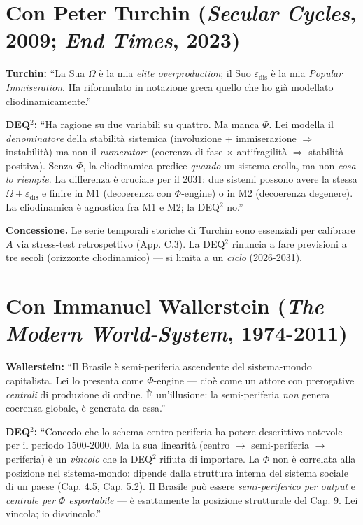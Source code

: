 \section{\texorpdfstring{Con Peter Turchin (\emph{Secular Cycles}, 2009;
\emph{End Times},
2023)}{Con Peter Turchin (Secular Cycles, 2009; End Times, 2023)}}\label{con-peter-turchin-secular-cycles-2009-end-times-2023}

\textbf{Turchin:} ``La Sua \(\Omega\) è la mia \emph{elite
overproduction}; il Suo \(\varepsilon_{\text{dis}}\) è la mia
\emph{Popular Immiseration}. Ha riformulato in notazione greca quello
che ho già modellato cliodinamicamente.''

\textbf{DEQ$^2$:} ``Ha ragione su due variabili su quattro. Ma manca
\(\Phi\). Lei modella il \emph{denominatore} della stabilità sistemica
(involuzione + immiserazione \(\Rightarrow\) instabilità) ma non il
\emph{numeratore} (coerenza di fase \(\times\) antifragilità
\(\Rightarrow\) stabilità positiva). Senza \(\Phi\), la cliodinamica
predice \emph{quando} un sistema crolla, ma non \emph{cosa lo riempie}.
La differenza è cruciale per il 2031: due sistemi possono avere la
stessa \(\Omega + \varepsilon_{\text{dis}}\) e finire in M1 (decoerenza
con \(\Phi\)-engine) o in M2 (decoerenza degenere). La cliodinamica è
agnostica fra M1 e M2; la DEQ$^2$ no.''

\textbf{Concessione.} Le serie temporali storiche di Turchin sono
essenziali per calibrare \(A\) via stress-test retrospettivo (App. C.3).
La DEQ$^2$ rinuncia a fare previsioni a tre secoli (orizzonte cliodinamico)
--- si limita a un \emph{ciclo} (2026-2031).



\section{\texorpdfstring{Con Immanuel Wallerstein (\emph{The Modern
World-System},
1974-2011)}{Con Immanuel Wallerstein (The Modern World-System, 1974-2011)}}\label{con-immanuel-wallerstein-the-modern-world-system-1974-2011}

\textbf{Wallerstein:} ``Il Brasile è semi-periferia ascendente del
sistema-mondo capitalista. Lei lo presenta come \(\Phi\)-engine --- cioè
come un attore con prerogative \emph{centrali} di produzione di ordine.
È un'illusione: la semi-periferia \emph{non} genera coerenza globale, è
generata da essa.''

\textbf{DEQ$^2$:} ``Concedo che lo schema centro-periferia ha potere
descrittivo notevole per il periodo 1500-2000. Ma la sua linearità
(centro \(\to\) semi-periferia \(\to\) periferia) è un \emph{vincolo}
che la DEQ$^2$ rifiuta di importare. La \(\Phi\) non è correlata alla
posizione nel sistema-mondo: dipende dalla struttura interna del sistema
sociale di un paese (Cap. 4.5, Cap. 5.2). Il Brasile può essere
\emph{semi-periferico per output} e \emph{centrale per \(\Phi\)
esportabile} --- è esattamente la posizione strutturale del Cap. 9. Lei
vincola; io disvincolo.''

